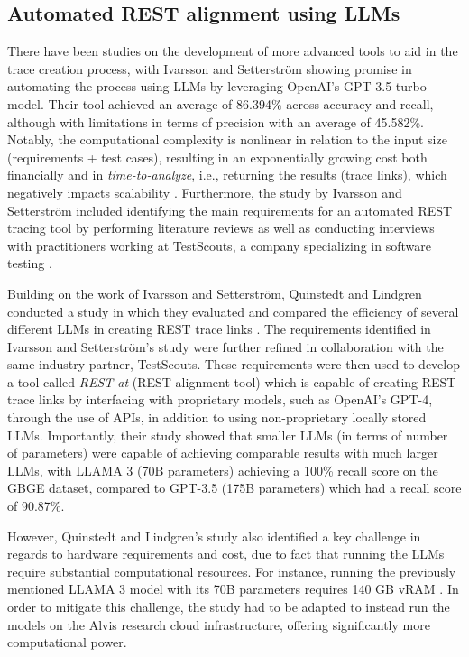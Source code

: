 \documentclass[conference]{IEEEtran}
\begin{document}
\subsection{Automated REST alignment using LLMs} 

There have been studies on the development of more advanced tools to aid in the
trace creation process, with Ivarsson and Setterström showing promise in
automating the process using LLMs by leveraging OpenAI’s GPT-3.5-turbo
model\cite{ivarsson2023automated}. Their tool achieved an average of 86.394\%
across accuracy and recall, although with limitations in terms of precision with
an average of 45.582\%. Notably, the computational complexity is nonlinear in
relation to the input size (requirements + test cases), resulting in an
exponentially growing cost both financially and in \textit{time-to-analyze},
i.e., returning the results (trace links), which negatively impacts scalability
\cite{ivarsson2023automated}. Furthermore, the study by Ivarsson and Setterström
included identifying the main requirements for an automated REST tracing tool by
performing literature reviews as well as conducting interviews with
practitioners working at TestScouts, a
company specializing in software testing \cite{ivarsson2023automated}.

Building on the work of Ivarsson and Setterström, Quinstedt and Lindgren
conducted a study in which they evaluated and compared the efficiency of
several different LLMs in creating REST trace links
\cite{quinstedt2024Optimizing}. The requirements identified in Ivarsson and
Setterström's study \cite{ivarsson2023automated} were further refined in
collaboration with the same industry partner, TestScouts. These requirements
were then used to develop a tool called \textit{REST-at} (REST alignment tool)
which is capable of creating REST trace links by interfacing with proprietary
models, such as OpenAI's GPT-4, through the use of APIs, in addition to using
non-proprietary locally stored LLMs. Importantly, their study showed that
smaller LLMs (in terms of number of parameters) were capable of achieving
comparable results with much larger LLMs, with LLAMA 3 (70B parameters)
achieving a 100\% recall score on the GBGE dataset, compared to GPT-3.5 (175B
parameters) which had a recall score of 90.87\%. 


However, Quinstedt and Lindgren's study also identified a key challenge in
regards to hardware requirements and cost, due to fact that running the LLMs
require substantial computational resources. For instance, running the
previously mentioned LLAMA 3 model with its 70B parameters requires 140 GB vRAM
\cite{quinstedt2024Optimizing}. In order to mitigate this challenge, the study
had to be adapted to instead run the models on the Alvis research cloud 
infrastructure, offering significantly more computational power.
\end{document}
